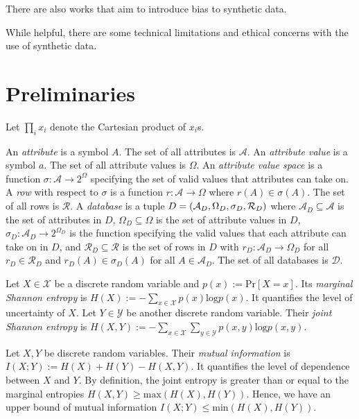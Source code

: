 \documentclass[manuscript,screen,review,anonymous]{acmart}
\DeclarePairedDelimiter{\tuple}{(}{)}
\renewcommand{\implies}{\rightarrow}
\newcommand{\db}{D}
\newcommand{\dbs}{\mathcal{D}}
\newcommand{\prob}[1]{\text{Pr}[#1]}
\newcommand{\mi}[2]{I(#1;#2)}
\newcommand{\entropy}[1]{H(#1)}
\begin{document}
There are also works that aim to introduce bias to synthetic data\cite{jiang2024synthetic,baumann2023bias}.

While helpful, there are some technical limitations\cite{stadler2022synthetic,cheng2021can,ganev2022robin,wyllie2024fairness} and ethical concerns\cite{whitney2024real} with the use of synthetic data.

\section{Preliminaries}
\label{sec:prelim}

Let $\prod_i x_i$ denote the Cartesian product of $x_i$s.

An \emph{attribute} is a symbol $A$.
The set of all attributes is $\mathcal{A}$.
An \emph{attribute value} is a symbol $a$.
The set of all attribute values is $\Omega$.
An \emph{attribute value space} is a function $\sigma : \mathcal{A} \implies 2^{\Omega}$
specifying the set of valid values that attributes can take on.
A \emph{row} with respect to $\sigma$
is a function $r : \mathcal{A} \implies \Omega$
where $r(A) \in \sigma(A)$.
The set of all rows is $\mathcal{R}$.
A \emph{database} is a tuple $\db =
\tuple{
    \mathcal{A}_{\db},
    \Omega_{\db},
    \sigma_{\db},
    \mathcal{R}_{\db}
}$
where
$\mathcal{A}_{\db} \subseteq \mathcal{A}$
is the set of attributes in $\db$,
$\Omega_{\db} \subseteq \Omega$
is the set of attribute values in $\db$,
$\sigma_{\db} : \mathcal{A}_{\db} \implies 2^{\Omega_{\db}}$
is the function specifying the valid values that each attribute can take on in $\db$,
and $\mathcal{R}_{\db} \subseteq \mathcal{R}$
is the set of rows in $\db$
with $r_\db : \mathcal{A}_\db \implies \Omega_\db$
for all $r_\db \in \mathcal{R}_\db$
and $r_\db(A) \in \sigma_\db(A)$
for all $A \in \mathcal{A}_\db$.
The set of all databases is $\dbs$.

Let $X \in \mathcal{X}$ be a discrete random variable and $p(x) := \prob{X = x}$. Its \emph{marginal Shannon entropy} is $\entropy{X} := -\sum_{x \in \mathcal{X}} p(x) \text{log} p(x)$. It quantifies the level of uncertainty of $X$. Let $Y \in \mathcal{Y}$ be another discrete random variable. Their \emph{joint Shannon entropy} is $\entropy{X,Y} := -\sum_{x \in \mathcal{X}} \sum_{y \in \mathcal{Y}} p(x, y) \text{log} p(x, y)$.

Let $X,Y$ be discrete random variables. Their \emph{mutual information} is $\mi{X}{Y} := \entropy{X} + \entropy{Y} - \entropy{X,Y}$. It quantifies the level of dependence between $X$ and $Y$. By definition\cite{427884}, the joint entropy is greater than or equal to the marginal entropies $\entropy{X,Y} \geq \text{max}(\entropy{X},\entropy{Y})$. Hence, we have an upper bound of mutual information $\mi{X}{Y} \leq \text{min}(\entropy{X}, \entropy{Y})$.
\end{document}
